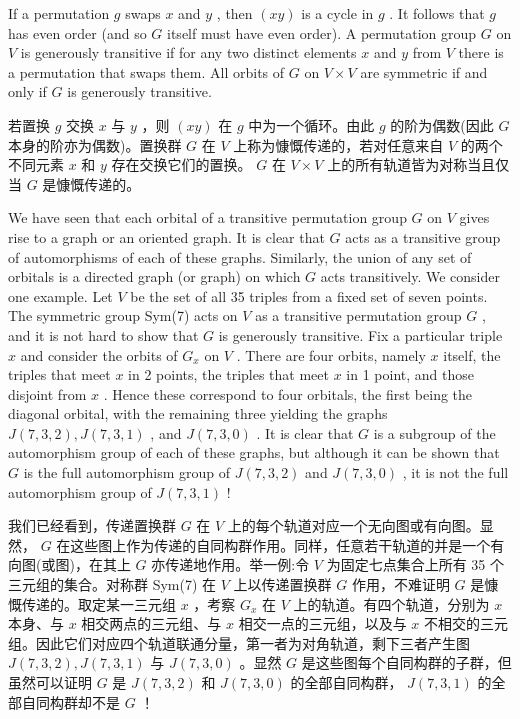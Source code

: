 \documentclass[10pt]{article}
\begin{document}
If a permutation \(g\) swaps \(x\) and \(y\) , then \(\left( {xy}\right)\) is a cycle in \(g\) . It follows that \(g\) has even order (and so \(G\) itself must have even order). A permutation group \(G\) on \(V\) is generously transitive if for any two distinct elements \(x\) and \(y\) from \(V\) there is a permutation that swaps them. All orbits of \(G\) on \(V \times  V\) are symmetric if and only if \(G\) is generously transitive.

\begin{tcolorbox}\relax
若置换 \(g\) 交换 \(x\) 与 \(y\) ，则 \(\left( {xy}\right)\) 在 \(g\) 中为一个循环。由此 \(g\) 的阶为偶数(因此 \(G\) 本身的阶亦为偶数)。置换群 \(G\) 在 \(V\) 上称为慷慨传递的，若对任意来自 \(V\) 的两个不同元素 \(x\) 和 \(y\) 存在交换它们的置换。 \(G\) 在 \(V \times  V\) 上的所有轨道皆为对称当且仅当 \(G\) 是慷慨传递的。
\end{tcolorbox}

We have seen that each orbital of a transitive permutation group \(G\) on \(V\) gives rise to a graph or an oriented graph. It is clear that \(G\) acts as a transitive group of automorphisms of each of these graphs. Similarly, the union of any set of orbitals is a directed graph (or graph) on which \(G\) acts transitively. We consider one example. Let \(V\) be the set of all 35 triples from a fixed set of seven points. The symmetric group Sym(7) acts on \(V\) as a transitive permutation group \(G\) , and it is not hard to show that \(G\) is generously transitive. Fix a particular triple \(x\) and consider the orbits of \({G}_{x}\) on \(V\) . There are four orbits, namely \(x\) itself, the triples that meet \(x\) in 2 points, the triples that meet \(x\) in 1 point, and those disjoint from \(x\) . Hence these correspond to four orbitals, the first being the diagonal orbital, with the remaining three yielding the graphs \(J\left( {7,3,2}\right) ,J\left( {7,3,1}\right)\) , and \(J\left( {7,3,0}\right)\) . It is clear that \(G\) is a subgroup of the automorphism group of each of these graphs, but although it can be shown that \(G\) is the full automorphism group of \(J\left( {7,3,2}\right)\) and \(J\left( {7,3,0}\right)\) , it is not the full automorphism group of \(J\left( {7,3,1}\right)\) !

\begin{tcolorbox}\relax
我们已经看到，传递置换群 \(G\) 在 \(V\) 上的每个轨道对应一个无向图或有向图。显然， \(G\) 在这些图上作为传递的自同构群作用。同样，任意若干轨道的并是一个有向图(或图)，在其上 \(G\) 亦传递地作用。举一例:令 \(V\) 为固定七点集合上所有 35 个三元组的集合。对称群 Sym(7) 在 \(V\) 上以传递置换群 \(G\) 作用，不难证明 \(G\) 是慷慨传递的。取定某一三元组 \(x\) ，考察 \({G}_{x}\) 在 \(V\) 上的轨道。有四个轨道，分别为 \(x\) 本身、与 \(x\) 相交两点的三元组、与 \(x\) 相交一点的三元组，以及与 \(x\) 不相交的三元组。因此它们对应四个轨道联通分量，第一者为对角轨道，剩下三者产生图 \(J\left( {7,3,2}\right) ,J\left( {7,3,1}\right)\) 与 \(J\left( {7,3,0}\right)\) 。显然 \(G\) 是这些图每个自同构群的子群，但虽然可以证明 \(G\) 是 \(J\left( {7,3,2}\right)\) 和 \(J\left( {7,3,0}\right)\) 的全部自同构群， \(J\left( {7,3,1}\right)\) 的全部自同构群却不是 \(G\) ！
\end{tcolorbox}
\end{document}
